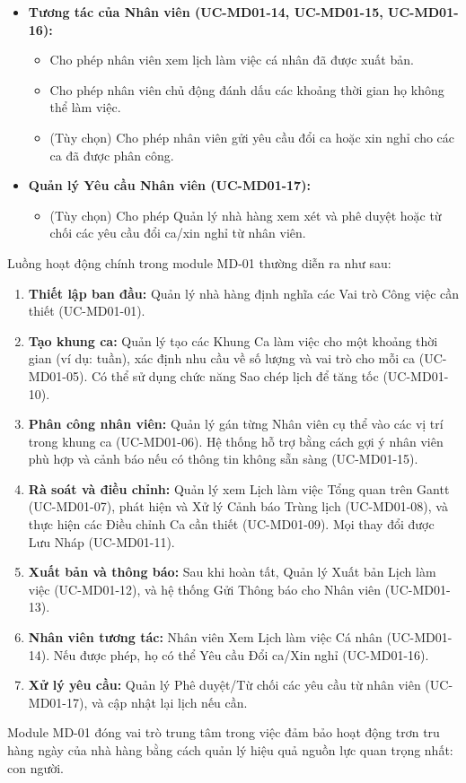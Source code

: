 \begin{itemize}
    \item \textbf{Tương tác của Nhân viên (UC-MD01-14, UC-MD01-15, UC-MD01-16):}
    \begin{itemize}
        \item Cho phép nhân viên xem lịch làm việc cá nhân đã được xuất bản.
        \item Cho phép nhân viên chủ động đánh dấu các khoảng thời gian họ không thể làm việc.
        \item (Tùy chọn) Cho phép nhân viên gửi yêu cầu đổi ca hoặc xin nghỉ cho các ca đã được phân công.
    \end{itemize}

    \item \textbf{Quản lý Yêu cầu Nhân viên (UC-MD01-17):}
    \begin{itemize}
        \item (Tùy chọn) Cho phép Quản lý nhà hàng xem xét và phê duyệt hoặc từ chối các yêu cầu đổi ca/xin nghỉ từ nhân viên.
    \end{itemize}
\end{itemize}

\label{sssec:md01_overall_workflow}
Luồng hoạt động chính trong module MD-01 thường diễn ra như sau:
\begin{enumerate}
    \item \textbf{Thiết lập ban đầu:} Quản lý nhà hàng định nghĩa các Vai trò Công việc cần thiết (UC-MD01-01).
    \item \textbf{Tạo khung ca:} Quản lý tạo các Khung Ca làm việc cho một khoảng thời gian (ví dụ: tuần), xác định nhu cầu về số lượng và vai trò cho mỗi ca (UC-MD01-05). Có thể sử dụng chức năng Sao chép lịch để tăng tốc (UC-MD01-10).
    \item \textbf{Phân công nhân viên:} Quản lý gán từng Nhân viên cụ thể vào các vị trí trong khung ca (UC-MD01-06). Hệ thống hỗ trợ bằng cách gợi ý nhân viên phù hợp và cảnh báo nếu có thông tin không sẵn sàng (UC-MD01-15).
    \item \textbf{Rà soát và điều chỉnh:} Quản lý xem Lịch làm việc Tổng quan trên Gantt (UC-MD01-07), phát hiện và Xử lý Cảnh báo Trùng lịch (UC-MD01-08), và thực hiện các Điều chỉnh Ca cần thiết (UC-MD01-09). Mọi thay đổi được Lưu Nháp (UC-MD01-11).
    \item \textbf{Xuất bản và thông báo:} Sau khi hoàn tất, Quản lý Xuất bản Lịch làm việc (UC-MD01-12), và hệ thống Gửi Thông báo cho Nhân viên (UC-MD01-13).
    \item \textbf{Nhân viên tương tác:} Nhân viên Xem Lịch làm việc Cá nhân (UC-MD01-14). Nếu được phép, họ có thể Yêu cầu Đổi ca/Xin nghỉ (UC-MD01-16).
    \item \textbf{Xử lý yêu cầu:} Quản lý Phê duyệt/Từ chối các yêu cầu từ nhân viên (UC-MD01-17), và cập nhật lại lịch nếu cần.
\end{enumerate}
Module MD-01 đóng vai trò trung tâm trong việc đảm bảo hoạt động trơn tru hàng ngày của nhà hàng bằng cách quản lý hiệu quả nguồn lực quan trọng nhất: con người.
